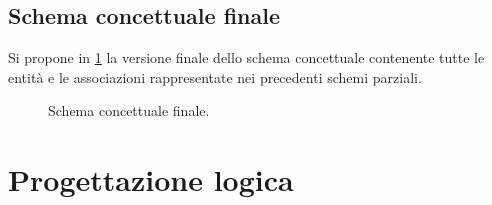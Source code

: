 \documentclass[a4paper,12pt]{report}
\begin{document}
\section{Schema concettuale finale}
Si propone in \cref{fig:full-schema} la versione finale dello schema concettuale contenente tutte le entità e le associazioni rappresentate nei precedenti schemi parziali.

\begin{figure}
\centering{}
%
\caption{Schema concettuale finale.}
\label{fig:full-schema}
\end{figure}

\chapter{Progettazione logica}
\end{document}
